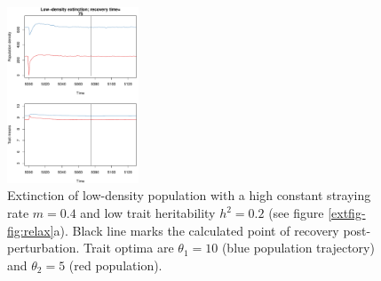 \documentclass{revtex4}
\begin{document}
\begin{figure}
  \captionsetup{justification=raggedright,
singlelinecheck=false
}
\centering
\includegraphics[width=0.35\textwidth]{fig_relax_small.pdf}
\caption{
Extinction of low-density population with a high constant straying rate $m=0.4$ and low trait heritability $h^2=0.2$ (see figure \ref{extfig-fig:relax}a).
Black line marks the calculated point of recovery post-perturbation.
Trait optima are $\theta_1 = 10$ (blue population trajectory) and $\theta_2 = 5$ (red population).
} \label{fig:relaxtraj_ldlh}
\end{figure}
\end{document}
